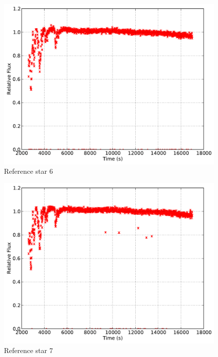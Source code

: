 \documentclass{aastex61}
\begin{document}
\begin{figure}[h]
	\centering
	\includegraphics[scale = .30]{exo_curves6.pdf}
	\caption{Reference star 6}
	\label{fig: refcurve6}
\end{figure}
\begin{figure}[h]
	\centering
	\includegraphics[scale = .30]{exo_curves7.pdf}
	\caption{Reference star 7}
	\label{fig: refcurve7}
\end{figure}
\end{document}
